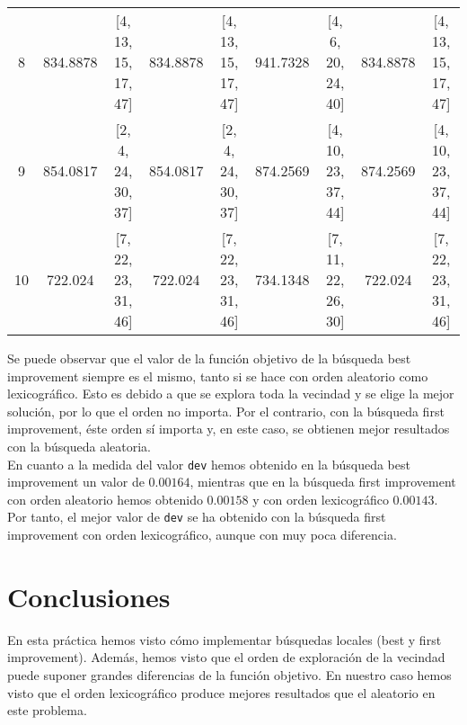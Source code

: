 \documentclass[12pt,a4paper,twoside,openright,titlepage,final]{article}
\begin{document}
\begin{table}[htbp!]
{\begin{tabular}{@{}ccccccccc@{}}
		8                          & 834.8878         & {[}4, 13, 15, 17, 47{]}  & 834.8878         & {[}4, 13, 15, 17, 47{]}  & 941.7328         & {[}4, 6, 20, 24, 40{]}   & 834.8878         & {[}4, 13, 15, 17, 47{]}  \\
		9                          & 854.0817         & {[}2, 4, 24, 30, 37{]}   & 854.0817         & {[}2, 4, 24, 30, 37{]}   & 874.2569         & {[}4, 10, 23, 37, 44{]}  & 874.2569         & {[}4, 10, 23, 37, 44{]}  \\
		10                         & 722.024          & {[}7, 22, 23, 31, 46{]}  & 722.024          & {[}7, 22, 23, 31, 46{]}  & 734.1348         & {[}7, 11, 22, 26, 30{]}  & 722.024          & {[}7, 22, 23, 31, 46{]}  \\ \bottomrule
	\end{tabular}%
}
\end{table}

Se puede observar que el valor de la función objetivo de la búsqueda best improvement siempre es el mismo, tanto si se hace con orden aleatorio como lexicográfico. Esto es debido a que se explora toda la vecindad y se elige la mejor solución, por lo que el orden no importa. Por el contrario, con la búsqueda first improvement, éste orden sí importa y, en este caso, se obtienen mejor resultados con la búsqueda aleatoria.\\

En cuanto a la medida del valor \texttt{dev} hemos obtenido en la búsqueda best improvement un valor de $0.00164$, mientras que en la búsqueda first improvement con orden aleatorio hemos obtenido $0.00158$ y con orden lexicográfico $0.00143$.\\

Por tanto, el mejor valor de \texttt{dev} se ha obtenido con la búsqueda first improvement con orden lexicográfico, aunque con muy poca diferencia.
\section{Conclusiones}

En esta práctica hemos visto cómo implementar búsquedas locales (best y first improvement). Además, hemos visto que el orden de exploración de la vecindad puede suponer grandes diferencias de la función objetivo. En nuestro caso hemos visto que el orden lexicográfico produce mejores resultados que el aleatorio en este problema.  
\end{document}
